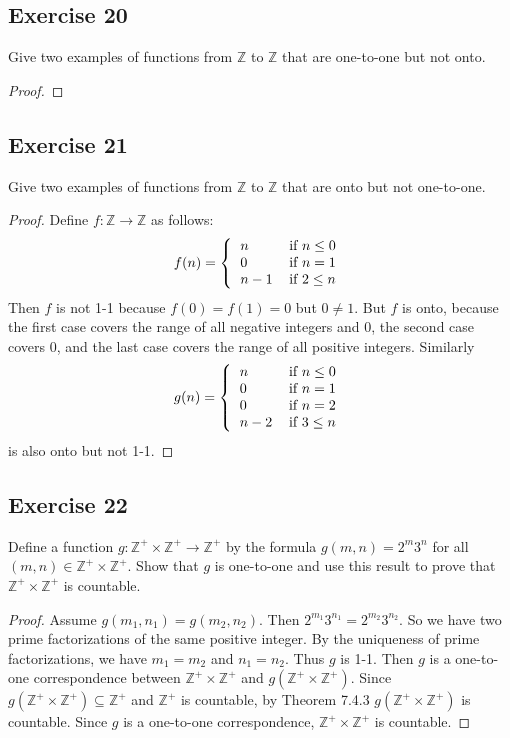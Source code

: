 \documentclass[14pt]{extarticle}
\newcommand{\Z}{\mathbb{Z}}
\begin{document}
\subsection{Exercise 20}
Give two examples of functions from $\Z$ to $\Z$ that are one-to-one but not onto.

\begin{proof}

\end{proof}

\subsection{Exercise 21}
Give two examples of functions from $\Z$ to $\Z$ that are onto but not one-to-one.

\begin{proof}
    Define \(f: \Z \to \Z\) as follows:
    \[
        f(n) =
        \left\{
        \begin{tabular}{ll}
            \(n\)   & if \(n \leq 0\) \\
            \(0\)   & if \(n = 1\)    \\
            \(n-1\) & if \(2 \leq n\)
        \end{tabular}
        \right.
    \]
    Then $f$ is not 1-1 because \(f(0) = f(1) = 0\) but \(0 \neq 1\). But $f$ is onto, because the first case covers
    the range of all negative integers and 0, the second case covers 0, and the last case covers the range of all positive integers. Similarly
    \[
        g(n) =
        \left\{
        \begin{tabular}{ll}
            \(n\)   & if \(n \leq 0\) \\
            \(0\)   & if \(n = 1\)    \\
            \(0\)   & if \(n = 2\)    \\
            \(n-2\) & if \(3 \leq n\)
        \end{tabular}
        \right.
    \]
    is also onto but not 1-1.
\end{proof}

\subsection{Exercise 22}
Define a function \(g: \Z^+ \times \Z^+ \to \Z^+\) by the formula \(g(m, n) = 2^m3^n\) for all \((m, n) \in \Z^+
\times \Z^+\). Show that $g$ is one-to-one and use this result to prove that \(\Z^+ \times \Z^+\) is countable.

\begin{proof}
    Assume \(g(m_1, n_1) = g(m_2, n_2)\). Then \(2^{m_1}3^{n_1} = 2^{m_2}3^{n_2}\). So we have two prime factorizations of
    the same positive integer. By the uniqueness of prime factorizations, we have \(m_1 = m_2\) and \(n_1 = n_2\).
    Thus $g$ is 1-1. Then $g$ is a one-to-one correspondence between \(\Z^+ \times \Z^+\) and \(g(\Z^+ \times \Z^+)\).
    Since \(g(\Z^+ \times \Z^+) \subseteq \Z^+\) and $\Z^+$ is countable, by Theorem 7.4.3 \(g(\Z^+ \times \Z^+)\) is
    countable. Since $g$ is a one-to-one correspondence, \(\Z^+ \times \Z^+\) is countable.
\end{proof}
\end{document}

